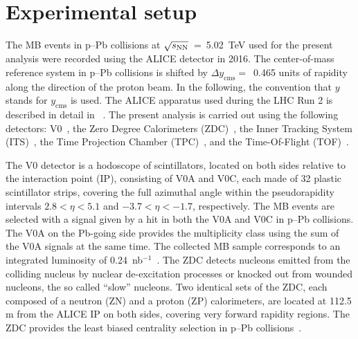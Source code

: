 \section{Experimental setup}
\label{sec:setup}
The MB events in p--Pb collisions at $\sqrt{s_{\rm NN}}$~=~5.02~TeV used for the present analysis were recorded using the ALICE detector in 2016. The center-of-mass reference system in p--Pb collisions is shifted by $\Delta y_{\mathrm{cms}} =$~0.465 units of rapidity along the direction of the proton beam. In the following, the convention that $y$ stands for $y_{\mathrm{cms}}$ is used. The ALICE apparatus used during the LHC Run 2 is described in detail in ~\cite{Abelev:2014ffa}. The present analysis is carried out using the following detectors: V0~\cite{ALICE:2013axi}, the Zero Degree Calorimeters (ZDC)~\cite{Cortese:2019nnv}, the Inner Tracking System (ITS)~\cite{ALICE:2010tia}, the Time Projection Chamber (TPC)~\cite{Alme:2010ke}, and the Time-Of-Flight (TOF)~\cite{Jacazio:2018slq}. 

The V0 detector is a hodoscope of scintillators, located on both sides relative to the interaction point (IP), consisting of V0A and V0C, each made of 32 plastic scintillator strips, covering the full azimuthal angle within the pseudorapidity intervals $2.8 < \eta < 5.1$ and $-3.7 < \eta < -1.7$, respectively. The MB events are selected with a signal given by a hit in both the V0A and V0C in p--Pb collisions. The V0A on the Pb-going side provides the multiplicity class using the sum of the V0A signals at the same time. The collected MB sample corresponds to an integrated luminosity of 0.24~nb$^{-1}$~\cite{ALICE:2014gvw}. The ZDC detects nucleons emitted from the colliding nucleus by nuclear de-excitation processes or knocked out from wounded nucleons, the so called “slow” nucleons. Two identical sets of the ZDC, each composed of a neutron (ZN) and a proton (ZP) calorimeters, are located at 112.5 m from the ALICE IP on both sides, covering very forward rapidity regions. The ZDC provides the least biased centrality selection in p--Pb collisions~\cite{ALICE:2014xsp}.

